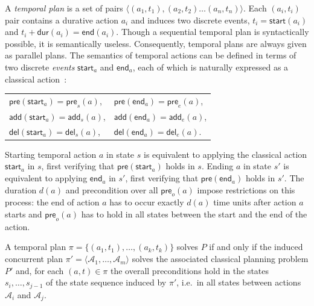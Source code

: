 \documentclass[runningheads]{llncs}
\newcommand{\tup}[1]{{\langle #1 \rangle}}
\newcommand{\pre}{\mathsf{pre}}    %
\newcommand{\dur}{\mathsf{dur}}    %
\newcommand{\start}{\mathsf{start}}%
\newcommand{\en}{\mathsf{end}}     %
\newcommand{\add}{\mathsf{add}}
\newcommand{\del}{\mathsf{del}}
\begin{document}
A {\em temporal plan} is a set of pairs $\tup{(a_1,t_1),(a_2,t_2)\ldots (a_n,t_n)}$. Each $(a_i,t_i)$ pair contains a durative action $a_i$ and induces two discrete events, $t_i=\start(a_i)$ and $t_i+\dur(a_i)=\en(a_i)$. Though a sequential temporal plan is syntactically possible, it is semantically useless. Consequently, temporal plans are always given as parallel plans. The semantics of temporal actions can be defined in terms of two discrete \textit{events} $\mathsf{start}_a$ and $\mathsf{end}_a$, each of which is naturally expressed as a classical action~\cite{jimenez2015temporal}:

\vspace*{5pt}
\begin{tabular}{ll}
$\pre(\mathsf{start}_a) = \pre_s(a)$, & $\pre(\mathsf{end}_a) = \pre_e(a)$,\\[2pt]
$\add(\mathsf{start}_a) = \add_s(a)$, & $\add(\mathsf{end}_a) = \add_e(a)$,\\[2pt]
$\del(\mathsf{start}_a) = \del_s(a)$, & $\del(\mathsf{end}_a) = \del_e(a)$.
\end{tabular}
\vspace*{5pt}

Starting temporal action $a$ in state $s$ is equivalent to applying the classical action $\mathsf{start}_a$ in $s$, first verifying that $\mathsf{pre}(\mathsf{start}_a)$ holds in $s$. Ending $a$ in state $s'$ is equivalent to applying $\mathsf{end}_a$ in $s'$, first verifying that $\pre(\mathsf{end}_a)$ holds in $s'$. The duration $d(a)$ and precondition over all $\pre_o(a)$ impose restrictions on this process: the end of action $a$ has to occur exactly $d(a)$ time units after action $a$ starts and $\pre_o(a)$ has to hold in all states between the start and the end of the action. 

A temporal plan $\pi=\{(a_1,t_1),\ldots,(a_k,t_k)\}$ solves $P$ if and only if the induced concurrent plan $\pi'=\langle\mathcal{A}_1,\ldots,\mathcal{A}_m\rangle$ solves the associated classical planning problem $P'$ and, for each $(a,t)\in\pi$ the overall preconditions hold in the states $s_i,\ldots,s_{j-1}$ of the state sequence induced by $\pi'$, i.e.~in all states between actions $\mathcal{A}_i$ and $\mathcal{A}_j$.
\end{document}
